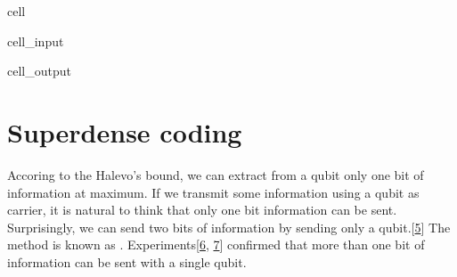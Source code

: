 \documentclass[letterpaper,10pt,english]{jupyterBook}
\begin{document}
\begin{sphinxuseclass}{cell}\begin{sphinxVerbatimInput}

\begin{sphinxuseclass}{cell_input}
\begin{sphinxVerbatim}[commandchars=\\\{\}]
   \PYG{p}{[}\PYG{p}{]}
\end{sphinxVerbatim}

\end{sphinxuseclass}\end{sphinxVerbatimInput}
\begin{sphinxVerbatimOutput}

\begin{sphinxuseclass}{cell_output}
\noindent{}

\end{sphinxuseclass}\end{sphinxVerbatimOutput}

\end{sphinxuseclass}
\sphinxstepscope


\section{Superdense coding}
\label{\detokenize{algorithms/densecoding:superdense-coding}}\label{\detokenize{algorithms/densecoding:sec-denscoding}}\label{\detokenize{algorithms/densecoding::doc}}
\sphinxAtStartPar
Accoring to the Halevo’s bound, we can extract from a qubit only one bit of information at maximum. If we transmit some information using a qubit as carrier, it is natural to think that only one bit information can be sent. Surprisingly, we can send two bits of information by sending only a qubit.{[}\hyperlink{cite.references:id23}{5}{]}  The method is known as .  Experiments{[}\hyperlink{cite.references:id24}{6}, \hyperlink{cite.references:id25}{7}{]} confirmed that more than one bit of information can be sent with a single qubit.
\end{document}

